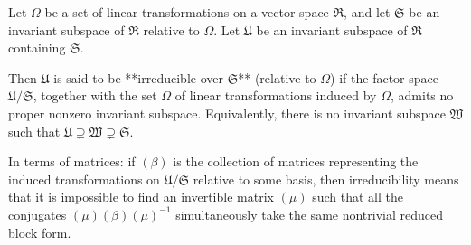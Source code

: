 Let $\Omega$ be a set of linear transformations on a vector space $\mathfrak{R}$, and let $\mathfrak{S}$ be an invariant subspace of $\mathfrak{R}$ relative to $\Omega$. Let $\mathfrak{U}$ be an invariant subspace of $\mathfrak{R}$ containing $\mathfrak{S}$.

Then $\mathfrak{U}$ is said to be **irreducible over $\mathfrak{S}$** (relative to $\Omega$) if the factor space $\mathfrak{U}/\mathfrak{S}$, together with the set $\bar{\Omega}$ of linear transformations induced by $\Omega$, admits no proper nonzero invariant subspace. Equivalently, there is no invariant subspace $\mathfrak{W}$ such that $\mathfrak{U} \supsetneq \mathfrak{W} \supsetneq \mathfrak{S}$.

In terms of matrices: if $(\beta)$ is the collection of matrices representing the induced transformations on $\mathfrak{U}/\mathfrak{S}$ relative to some basis, then irreducibility means that it is impossible to find an invertible matrix $(\mu)$ such that all the conjugates $(\mu)(\beta)(\mu)^{-1}$ simultaneously take the same nontrivial reduced block form.
